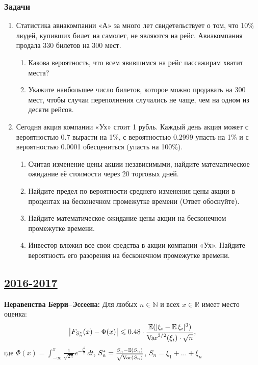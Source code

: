 \subsubsection*{Задачи}

\begin{enumerate}[resume]

\item Статистика авиакомпании «А» за много лет свидетельствует о том, что 10\% людей, купивших билет на самолет, не являются на рейс. Авиакомпания продала 330 билетов на 300 мест.
\begin{enumerate}
\item Какова вероятность, что всем явившимся на рейс пассажирам хватит места?
\item Укажите наибольшее число билетов, которое можно продавать на 300 мест, чтобы случаи переполнения случались не чаще, чем на одном из десяти рейсов.
\end{enumerate}

\item Сегодня акция компании «Ух» стоит 1 рубль. Каждый день акция может с вероятностью 0.7 вырасти на 1\%, с вероятностью 0.2999 упасть на 1\% и с вероятностью 0.0001 обесцениться (упасть на 100\%).
\begin{enumerate}
\item Считая изменение цены акции независимыми, найдите математическое ожидание её стоимости через 20 торговых дней.
\item Найдите предел по вероятности среднего изменения цены акции в процентах на бесконечном промежутке времени (Ответ обоснуйте).
\item Найдите математическое ожидание цены акции на бесконечном промежутке времени.
\item Инвестор вложил все свои средства в акции компании «Ух». Найдите вероятность его разорения на бесконечном промежутке времени.
\end{enumerate}
\end{enumerate}



\newpage
\subsection[2016-2017]{\hyperref[sec:sol_kr_02_2016_2017]{2016-2017}}
\label{sec:kr_02_2016_2017}

\textbf{Неравенства Берри–Эссеена:} Для любых $n \in \mathbb{N}$ и всех
$x \in \mathbb{R}$ имеет место оценка:
\[
\bigl|F_{S_n^{*}}(x) - \Phi(x)\bigr| \leqslant 0.48 \cdot \frac{\operatorname{\mathbb{E}}(|\xi_i - \operatorname{\mathbb{E}}\xi_i|^3)}{\operatorname{Var}^{3/2}(\xi_i)\cdot\sqrt{n}} \text{,}
\]
где $\Phi(x) = \int_{-\infty}^{x}\frac{1}{\sqrt{2\pi}}e^{-\frac{t^2}{2}}\,dt$, \; $S_n^* = \frac{S_n - \operatorname{\mathbb{E}}(S_n)}{\sqrt{\operatorname{Var}(S_n)}}$, \; $S_n = \xi_1 + \ldots + \xi_n$

